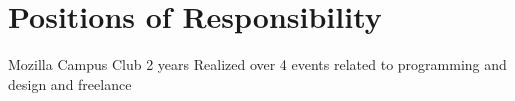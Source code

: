 \section{\textbf{Positions of Responsibility}}
\vspace{-0.4mm}
\resumeSubHeadingListStart
{} %
{Mozilla Campus Club} %
{2 years} %
{Realized over 4 events related to programming and design and freelance}
\resumeSubHeadingListEnd